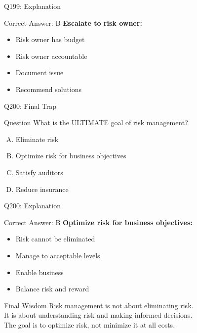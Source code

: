 \documentclass{beamer}
\begin{document}
	\begin{frame}{Q199: Explanation}
		\begin{block}{Correct Answer: B}
			\textbf{Escalate to risk owner:}
			\begin{itemize}
				\item Risk owner has budget
				\item Risk owner accountable
				\item Document issue
				\item Recommend solutions
			\end{itemize}
		\end{block}
	\end{frame}
	
	\begin{frame}{Q200: Final Trap}
		\begin{block}{Question}
			What is the ULTIMATE goal of risk management?
		\end{block}
		\begin{enumerate}[(A)]
			\item Eliminate risk
			\item Optimize risk for business objectives
			\item Satisfy auditors
			\item Reduce insurance
		\end{enumerate}
	\end{frame}
	
	\begin{frame}{Q200: Explanation}
		\begin{block}{Correct Answer: B}
			\textbf{Optimize risk for business objectives:}
			\begin{itemize}
				\item Risk cannot be eliminated
				\item Manage to acceptable levels
				\item Enable business
				\item Balance risk and reward
			\end{itemize}
		\end{block}
		\begin{alertblock}{Final Wisdom}
			Risk management is not about eliminating risk.\\
			It is about understanding risk and making informed decisions.\\
			The goal is to optimize risk, not minimize it at all costs.
		\end{alertblock}
	\end{frame}
	
\end{document}
